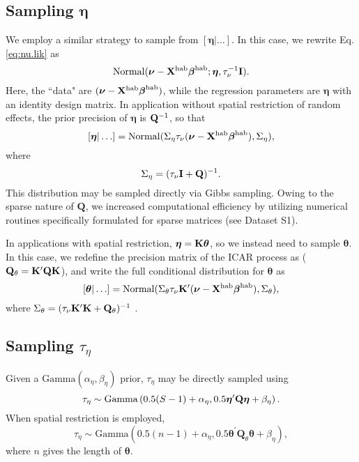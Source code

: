 \documentclass[10pt]{article}
\newcommand{\bQ}{\ensuremath{\mathbf{Q}}}
\begin{document}
\subsection*{Sampling $\boldsymbol{\eta}$}

We employ a similar strategy to sample from  $[\boldsymbol{\eta}|\hdots]$.  In this case, we
rewrite Eq. \ref{eq:nu.lik} as
$$
{\rm Normal}(\boldsymbol{\nu}-{\bf X}^{\rm hab}\boldsymbol{\beta}^{\rm hab};\boldsymbol{\eta} ,\tau_\nu^{-1}{\bf I}).
$$
Here, the ``data" are $(\boldsymbol{\nu}-{\bf X}^{\rm hab}\boldsymbol{\beta}^{\rm hab})$, while the regression parameters are $\boldsymbol{\eta}$ with an identity design matrix. In application without spatial restriction of random effects, the prior precision of $\boldsymbol{\eta}$ is ${\bf Q}^{-1}$, so that
$$
[\boldsymbol{\eta}|\hdots] = {\rm Normal}(\Sigma_\eta \tau_\nu (\boldsymbol{\nu}-{\bf X}^{\rm hab}\boldsymbol{\beta}^{\rm hab}),\Sigma_\eta),
$$
where
$$
\Sigma_\eta=(\tau_\nu{\bf I} + {\bf Q})^{-1}.
$$
This distribution may be sampled directly via Gibbs sampling. Owing to the sparse nature of $\bQ$, we increased computational efficiency by utilizing numerical routines specifically formulated for sparse matrices (see Dataset S1).

In applications with spatial restriction, $\boldsymbol{\eta} = {\bf K}\boldsymbol{\theta}$, so we instead need to sample $\boldsymbol{\theta}$.  In this case, we redefine the precision matrix of the ICAR process as ($\bQ_\theta={\bf K}^\prime \bQ {\bf K}$), and write the full conditional distribution for $\boldsymbol{\theta}$ as
$$
[\boldsymbol{\theta}|\hdots] = {\rm Normal}(\Sigma_\theta \tau_\nu {\bf K}^\prime (\boldsymbol{\nu}-{\bf X}^{\rm hab}\boldsymbol{\beta}^{\rm hab}),\Sigma_\theta),
$$
where $\Sigma_\theta=(\tau_\nu {\bf K}^\prime {\bf K} + {\bf Q_\theta})^{-1}$ \cite{HughesHaran2012,JohnsonEtAl2012}.



\subsection*{Sampling $\tau_\eta$}
Given a $\textrm{Gamma}(\alpha_\eta,\beta_\eta)$ prior, $\tau_\eta$ may be directly sampled using
$$
\tau_\eta \sim \textrm{Gamma}\left( 0.5(S-1)+\alpha_\eta,0.5\boldsymbol{\eta}^\prime {\bf Q} \boldsymbol{\eta}+\beta_\eta \right).
$$
When spatial restriction is employed,
$$
\tau_\eta \sim \textrm{Gamma}\left( 0.5(n-1)+\alpha_\eta,0.5\boldsymbol{\theta}^\prime \bQ_\theta \boldsymbol{\theta} +\beta_\eta \right),
$$
where $n$ gives the length of $\boldsymbol{\theta}$.
\end{document}
